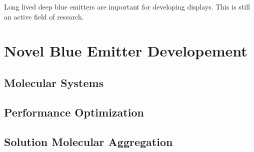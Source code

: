 \documentclass[../thesis.tex]{subfiles}
\begin{document}
Long lived deep blue emitters are important for developing displays.
This is still an active field of research.\supercite{Chan2018,Tang2018}

\chapter{Novel Blue Emitter Developement}

\section{Molecular Systems}
\section{Performance Optimization}
\section{Solution Molecular Aggregation}



\end{document}
